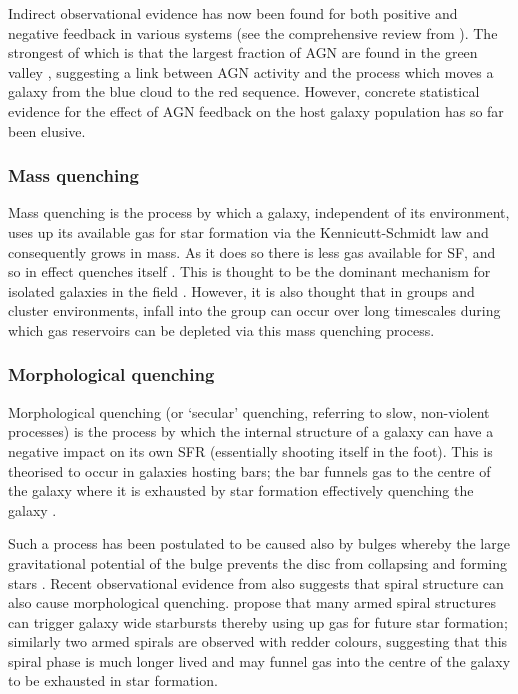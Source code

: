 Indirect observational evidence has now been found for both positive and negative feedback in various systems (see the comprehensive review from \citealt{fabian12}). The strongest of which is that the largest fraction of AGN are found in the green valley \citep{cowie08, Hickox09, schawinski10a}, suggesting a link between AGN activity and the process which moves a galaxy from the blue cloud to the red sequence. However, concrete statistical evidence for the effect of AGN feedback on the host galaxy population has so far been elusive.


\subsubsection{Mass quenching}\label{sec:massquench}
Mass quenching is the process by which a galaxy, independent of its environment, uses up its available gas for star formation via the Kennicutt-Schmidt law \citep{schmidt59, kennicutt98} and consequently grows in mass. As it does so there is less gas available for SF, and so in effect quenches itself \citep{peng12}. This is thought to be the dominant mechanism for isolated galaxies in the field \citep{kormendy04}. However, it is also thought that in groups and cluster environments, infall into the group can occur over long timescales during which gas reservoirs can be depleted via this mass quenching process.
 
\subsubsection{Morphological quenching}\label{sec:moprhquench}
Morphological quenching (or `secular' quenching, referring to slow, non-violent processes) is the process by which the internal structure of a galaxy can have a negative impact on its own SFR (essentially shooting itself in the foot). This is theorised to occur in galaxies hosting bars; the bar funnels gas to the centre of the galaxy \citep{athanassoula92a} where it is exhausted by star formation effectively quenching the galaxy \citep{zurita04, sheth05}. 

Such a process has been postulated to be caused also by bulges \citep{bluck14} whereby the large gravitational potential of the bulge prevents the disc from collapsing and forming stars \citep{Fang13}. Recent observational evidence from \citep{hart16} also suggests that spiral structure can also cause morphological quenching. \citeauthor{hart16} propose that many armed spiral structures can trigger galaxy wide starbursts thereby using up gas for future star formation; similarly two armed spirals are observed with redder colours, suggesting that this spiral phase is much longer lived and may funnel gas into the centre of the galaxy to be exhausted in star formation.  
  
